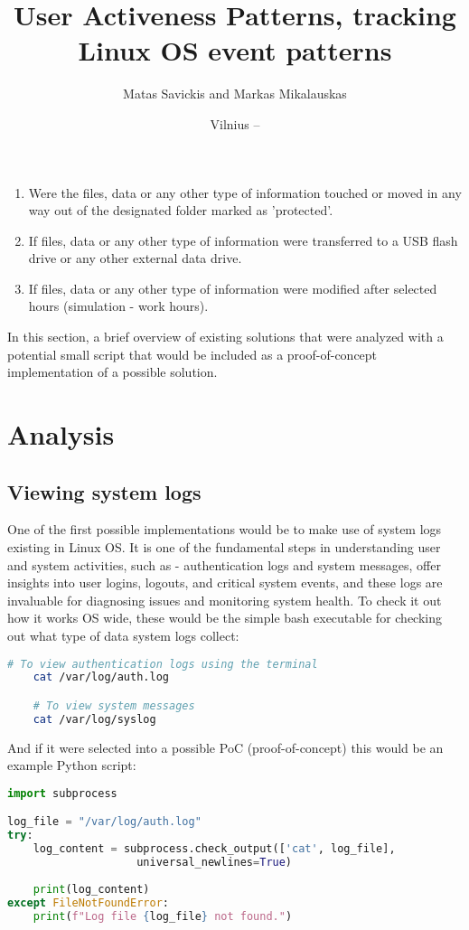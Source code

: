 \documentclass{VUMIFPSmagistrinis}
\title{User Activeness Patterns, tracking Linux OS event patterns}
\author{Matas Savickis and Markas Mikalauskas}
\date{Vilnius – \the\year}
\begin{document}

\maketitle

\tableofcontents

\begin{enumerate}
    \item Were the files, data or any other type of information touched or moved in any way out of the designated folder marked as 'protected'.
    \item If files, data or any other type of information were transferred to a USB flash drive or any other external data drive.
    \item If files, data or any other type of information were modified after selected hours (simulation - work hours).
\end{enumerate}

In this section, a brief overview of existing solutions that were analyzed with a potential small script that would be included as a proof-of-concept implementation of a possible solution. 

\section{Analysis}
\subsection{Viewing system logs}
One of the first possible implementations would be to make use of system logs existing in Linux OS. It is one of the fundamental steps in understanding user and system activities, such as - authentication logs and system messages, offer insights into user logins, logouts, and critical system events, and these logs are invaluable for diagnosing issues and monitoring system health. To check it out how it works OS wide, these would be the simple bash executable for checking out what type of data system logs collect:

\begin{lstlisting}[language=bash]
    # To view authentication logs using the terminal
    cat /var/log/auth.log 

    # To view system messages
    cat /var/log/syslog
\end{lstlisting}

\noindent And if it were selected into a possible PoC (proof-of-concept) this would be an example Python script:
\begin{lstlisting}[language=Python]
import subprocess

log_file = "/var/log/auth.log"
try:
    log_content = subprocess.check_output(['cat', log_file], 
                    universal_newlines=True)
    
    print(log_content)
except FileNotFoundError:
    print(f"Log file {log_file} not found.")
\end{lstlisting}
\end{document}
